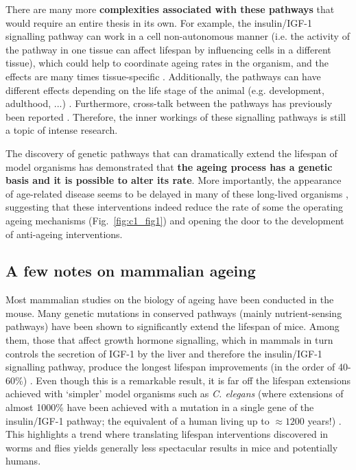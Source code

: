 \bigskip

There are many more \textbf{complexities associated with these pathways} that would require an entire thesis in its own. For example, the insulin/IGF-1 signalling pathway can work in a cell non-autonomous manner (i.e. the activity of the pathway in one tissue can affect lifespan by influencing cells in a different tissue), which could help to coordinate ageing rates in the organism, and the effects are many times tissue-specific \cite{Kenyon2005,Kenyon2010}. Additionally, the pathways can have different effects depending on the life stage of the animal (e.g. development, adulthood, ...) \cite{Dillin2002}. Furthermore, cross-talk between the pathways has previously been reported \cite{Bonkowski2016, Greer2007}. Therefore, the inner workings of these signalling pathways is still a topic of intense research.

\bigskip

The discovery of genetic pathways that can dramatically extend the lifespan of model organisms has demonstrated that \textbf{the ageing process has a genetic basis and it is possible to alter its rate}. More importantly, the appearance of age-related disease seems to be delayed in many of these long-lived organisms \cite{Kenyon2010,Arantes-Oliveira2003}, suggesting that these interventions indeed reduce the rate of some the operating ageing mechanisms (Fig.~\ref{fig:c1_fig1}) and opening the door to the development of anti-ageing interventions. 

\smallskip

\subsection{A few notes on mammalian ageing}

\smallskip

Most mammalian studies on the biology of ageing have been conducted in the mouse. Many genetic mutations in conserved pathways (mainly nutrient-sensing pathways) have been shown to significantly extend the lifespan of mice. Among them, those that affect growth hormone signalling, which in mammals in turn controls the secretion of IGF-1 by the liver and therefore the insulin/IGF-1 signalling pathway, produce the longest lifespan improvements (in the order of 40-60\%) \cite{Singh2019}. Even though this is a remarkable result, it is far off the lifespan extensions achieved with `simpler' model organisms such as \textit{C. elegans} (where extensions of almost 1000\% have been achieved with a mutation in a single gene of the insulin/IGF-1 pathway; the equivalent of a human living up to $\approx 1200$ years!) \cite{Ayyadevara2008}. This highlights a trend where translating lifespan interventions discovered in worms and flies yields generally less spectacular results in mice and potentially humans.

